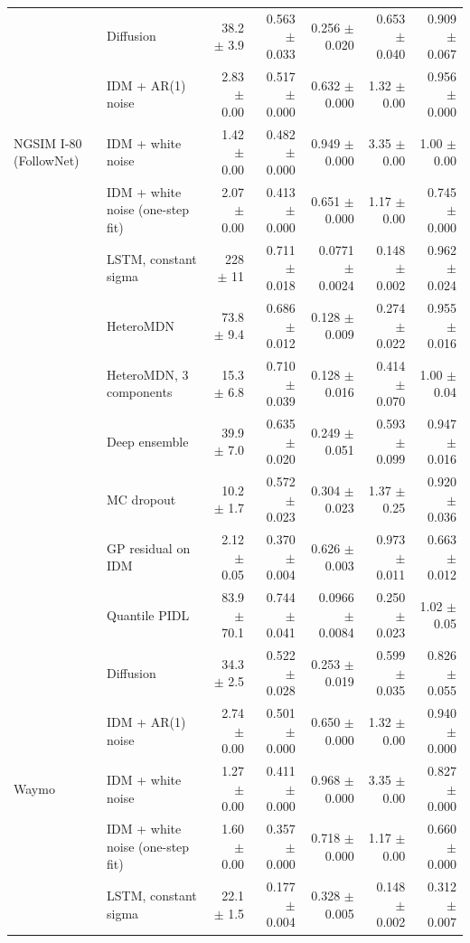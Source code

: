\begin{longtable}{llrrrrr}
 & Diffusion & 38.2 $\pm$ 3.9 & 0.563 $\pm$ 0.033 & 0.256 $\pm$ 0.020 & 0.653 $\pm$ 0.040 & 0.909 $\pm$ 0.067 \\
 & IDM + AR(1) noise & 2.83 $\pm$ 0.00 & 0.517 $\pm$ 0.000 & 0.632 $\pm$ 0.000 & 1.32 $\pm$ 0.00 & 0.956 $\pm$ 0.000 \\
\midrule
NGSIM I-80 (FollowNet) & IDM + white noise & 1.42 $\pm$ 0.00 & 0.482 $\pm$ 0.000 & 0.949 $\pm$ 0.000 & 3.35 $\pm$ 0.00 & 1.00 $\pm$ 0.00 \\
 & IDM + white noise (one-step fit) & 2.07 $\pm$ 0.00 & 0.413 $\pm$ 0.000 & 0.651 $\pm$ 0.000 & 1.17 $\pm$ 0.00 & 0.745 $\pm$ 0.000 \\
 & LSTM, constant sigma & 228 $\pm$ 11 & 0.711 $\pm$ 0.018 & 0.0771 $\pm$ 0.0024 & 0.148 $\pm$ 0.002 & 0.962 $\pm$ 0.024 \\
 & HeteroMDN & 73.8 $\pm$ 9.4 & 0.686 $\pm$ 0.012 & 0.128 $\pm$ 0.009 & 0.274 $\pm$ 0.022 & 0.955 $\pm$ 0.016 \\
 & HeteroMDN, 3 components & 15.3 $\pm$ 6.8 & 0.710 $\pm$ 0.039 & 0.128 $\pm$ 0.016 & 0.414 $\pm$ 0.070 & 1.00 $\pm$ 0.04 \\
 & Deep ensemble & 39.9 $\pm$ 7.0 & 0.635 $\pm$ 0.020 & 0.249 $\pm$ 0.051 & 0.593 $\pm$ 0.099 & 0.947 $\pm$ 0.016 \\
 & MC dropout & 10.2 $\pm$ 1.7 & 0.572 $\pm$ 0.023 & 0.304 $\pm$ 0.023 & 1.37 $\pm$ 0.25 & 0.920 $\pm$ 0.036 \\
 & GP residual on IDM & 2.12 $\pm$ 0.05 & 0.370 $\pm$ 0.004 & 0.626 $\pm$ 0.003 & 0.973 $\pm$ 0.011 & 0.663 $\pm$ 0.012 \\
 & Quantile PIDL & 83.9 $\pm$ 70.1 & 0.744 $\pm$ 0.041 & 0.0966 $\pm$ 0.0084 & 0.250 $\pm$ 0.023 & 1.02 $\pm$ 0.05 \\
 & Diffusion & 34.3 $\pm$ 2.5 & 0.522 $\pm$ 0.028 & 0.253 $\pm$ 0.019 & 0.599 $\pm$ 0.035 & 0.826 $\pm$ 0.055 \\
 & IDM + AR(1) noise & 2.74 $\pm$ 0.00 & 0.501 $\pm$ 0.000 & 0.650 $\pm$ 0.000 & 1.32 $\pm$ 0.00 & 0.940 $\pm$ 0.000 \\
\midrule
Waymo & IDM + white noise & 1.27 $\pm$ 0.00 & 0.411 $\pm$ 0.000 & 0.968 $\pm$ 0.000 & 3.35 $\pm$ 0.00 & 0.827 $\pm$ 0.000 \\
 & IDM + white noise (one-step fit) & 1.60 $\pm$ 0.00 & 0.357 $\pm$ 0.000 & 0.718 $\pm$ 0.000 & 1.17 $\pm$ 0.00 & 0.660 $\pm$ 0.000 \\
 & LSTM, constant sigma & 22.1 $\pm$ 1.5 & 0.177 $\pm$ 0.004 & 0.328 $\pm$ 0.005 & 0.148 $\pm$ 0.002 & 0.312 $\pm$ 0.007 \\

\end{longtable}
